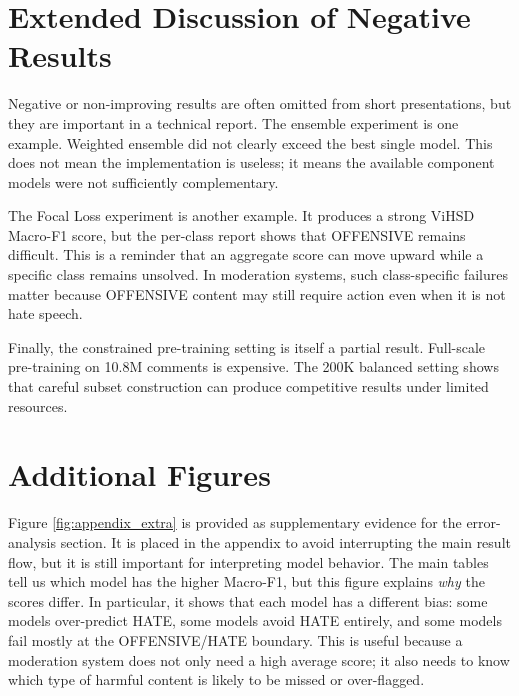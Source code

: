 \documentclass[journal]{IEEEtran}
\newcommand{\mf}{Macro-F1}
\begin{document}
\section{Extended Discussion of Negative Results}
Negative or non-improving results are often omitted from short presentations, but they are important in a technical report. The ensemble experiment is one example. Weighted ensemble did not clearly exceed the best single model. This does not mean the implementation is useless; it means the available component models were not sufficiently complementary.

The Focal Loss experiment is another example. It produces a strong ViHSD \mf{} score, but the per-class report shows that OFFENSIVE remains difficult. This is a reminder that an aggregate score can move upward while a specific class remains unsolved. In moderation systems, such class-specific failures matter because OFFENSIVE content may still require action even when it is not hate speech.

Finally, the constrained pre-training setting is itself a partial result. Full-scale pre-training on 10.8M comments is expensive. The 200K balanced setting shows that careful subset construction can produce competitive results under limited resources.

\section{Additional Figures}
Figure \ref{fig:appendix_extra} is provided as supplementary evidence for the error-analysis section. It is placed in the appendix to avoid interrupting the main result flow, but it is still important for interpreting model behavior. The main tables tell us which model has the higher \mf{}, but this figure explains \emph{why} the scores differ. In particular, it shows that each model has a different bias: some models over-predict HATE, some models avoid HATE entirely, and some models fail mostly at the OFFENSIVE/HATE boundary. This is useful because a moderation system does not only need a high average score; it also needs to know which type of harmful content is likely to be missed or over-flagged.
\end{document}
